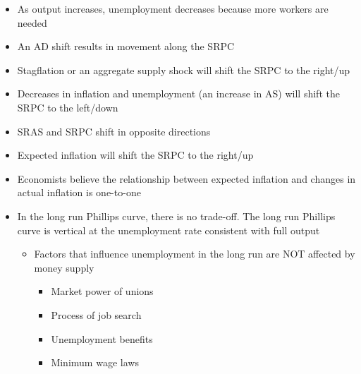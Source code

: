 \documentclass[12pt]{article}
\begin{document}
\begin{enumerate}
    \begin{itemize}

      \item As output increases, unemployment decreases because more workers are needed

      \item An AD shift results in movement along the SRPC

      \item Stagflation or an aggregate supply shock will shift the SRPC to the right/up 

      \item Decreases in inflation and unemployment (an increase in AS) will shift the SRPC to the left/down

      \item SRAS and SRPC shift in opposite directions

      \item Expected inflation will shift the SRPC to the right/up

      \item Economists believe the relationship between expected inflation and changes in actual inflation is one-to-one

      \item In the long run Phillips curve, there is no trade-off. The long run Phillips curve is vertical at the unemployment rate consistent with full output

        \begin{itemize}

          \item Factors that influence unemployment in the long run are NOT affected by money supply
            
            \begin{itemize}

              \item Market power of unions

              \item Process of job search

              \item Unemployment benefits

              \item Minimum wage laws

            \end{itemize}

        \end{itemize}


\end{itemize}
\end{enumerate}
\end{document}

